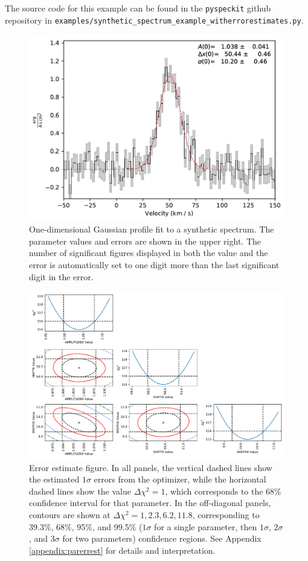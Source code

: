 \documentclass[twocolumn]{aastex62}
\newcommand{\pyspeckit}{\texttt{pyspeckit}\xspace}
\begin{document}
The source code for this example can be found in the \pyspeckit github
repository in \texttt{examples/synthetic\_spectrum\_example\_witherrorestimates.py}.

\begin{figure}[!htp]
\includegraphics[scale=1,width=7in]{oned_gaussfit_example.pdf}
\caption{One-dimensional Gaussian profile fit to a synthetic spectrum.
The parameter values and errors are shown in the upper right.  The number of
significant figures displayed in both the value and the error is automatically
set to one digit more than the last significant digit in the error.}
\label{fig:synthspecdemo}
\end{figure}


\begin{figure}[!htp]
\includegraphics[scale=1,width=7in]{error_estimate_demonstration.pdf}
\caption{Error estimate figure.
In all panels, the vertical
dashed lines show the estimated $1\sigma$ errors from the optimizer, while the
horizontal dashed lines show the value $\Delta\chi^2=1$, which corresponds to
the 68\% confidence interval for that parameter.
In the off-diagonal panels, contours are shown at $\Delta\chi^2=1,2.3,6.2,11.8$,
corresponding to 39.3\%, 68\%, 95\%, and 99.5\% ($1\sigma$ for a single parameter,
then $1\sigma$, $2\sigma$, and $3\sigma$ for two parameters) confidence
regions.
See Appendix \ref{appendix:parerrest} for details and interpretation.}
\label{fig:parerrestdemo}
\end{figure}
\end{document}
